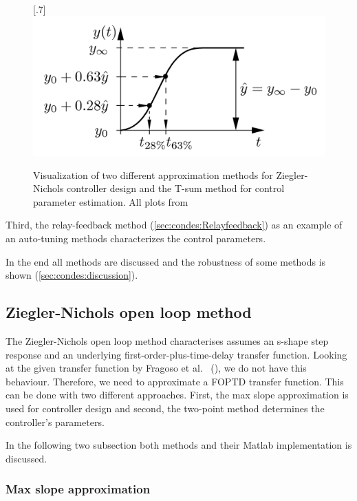 \begin{figure}[H]
\\
[.7\textwidth]{\includegraphics[width=1\linewidth]{fig/Dissli_Kienle_two_point_2023.png}}
    \caption{Visualization of two different approximation methods for Ziegler-Nichols controller design and the T-sum method for control parameter estimation. All plots from \cite{Dissli_Kienle_2023}}
    \label{fig:condes:different_methods}
\end{figure}


Third, the relay-feedback method (\autoref{sec:condes:Relayfeedback}) as an example of an auto-tuning methods characterizes the control parameters.

In the end all methods are discussed and the robustness of some methods is shown (\autoref{sec:condes:discussion}).



\subsection{Ziegler-Nichols open loop method}\label{sec:condes:ZN}

The Ziegler-Nichols open loop method characterises assumes an s-shape step response and an underlying first-order-plus-time-delay transfer function.
Looking at the given transfer function by Fragoso et al.~ (\cite[Table 2]{Fragoso_et_al_2017}), we do not have this behaviour.
Therefore, we need to approximate a FOPTD transfer function.
This can be done with two different approaches.
First, the max slope approximation is used for controller design and second, the two-point method determines the controller's parameters.

In the following two subsection both methods and their Matlab implementation is discussed. 


\subsubsection{Max slope approximation} \label{sec:condes:ZN:maxS}

